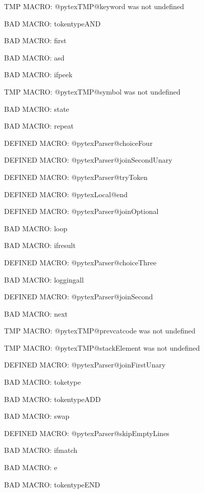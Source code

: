 \ifx\@pytexTMP@keyword\undefined\else TMP MACRO: @pytexTMP@keyword was not undefined
\fi

BAD MACRO: tokentypeAND

BAD MACRO: first

BAD MACRO: asd

BAD MACRO: ifpeek

\ifx\@pytexTMP@symbol\undefined\else TMP MACRO: @pytexTMP@symbol was not undefined
\fi

BAD MACRO: state

BAD MACRO: repeat

\ifx\@pytexParser@choiceFour\undefined\else DEFINED MACRO: @pytexParser@choiceFour
\fi

\ifx\@pytexParser@joinSecondUnary\undefined\else DEFINED MACRO: @pytexParser@joinSecondUnary
\fi

\ifx\@pytexParser@tryToken\undefined\else DEFINED MACRO: @pytexParser@tryToken
\fi

\ifx\@pytexLocal@end\undefined\else DEFINED MACRO: @pytexLocal@end
\fi

\ifx\@pytexParser@joinOptional\undefined\else DEFINED MACRO: @pytexParser@joinOptional
\fi

BAD MACRO: loop

BAD MACRO: ifresult

\ifx\@pytexParser@choiceThree\undefined\else DEFINED MACRO: @pytexParser@choiceThree
\fi

BAD MACRO: loggingall

\ifx\@pytexParser@joinSecond\undefined\else DEFINED MACRO: @pytexParser@joinSecond
\fi

BAD MACRO: next

\ifx\@pytexTMP@prevcatcode\undefined\else TMP MACRO: @pytexTMP@prevcatcode was not undefined
\fi

\ifx\@pytexTMP@stackElement\undefined\else TMP MACRO: @pytexTMP@stackElement was not undefined
\fi

\ifx\@pytexParser@joinFirstUnary\undefined\else DEFINED MACRO: @pytexParser@joinFirstUnary
\fi

BAD MACRO: toketype

BAD MACRO: tokentypeADD

BAD MACRO: swap

\ifx\@pytexParser@skipEmptyLines\undefined\else DEFINED MACRO: @pytexParser@skipEmptyLines
\fi

BAD MACRO: ifmatch

BAD MACRO: e

BAD MACRO: tokentypeEND

